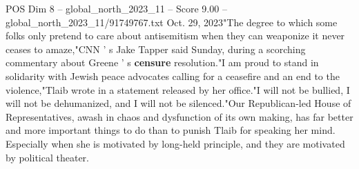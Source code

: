 \begin{textsample}{POS Dim 8 – global\_north\_2023\_11 – Score 9.00 – global\_north\_2023\_11/91749767.txt}
Oct. 29, 2023"The degree to which some folks only pretend to care about antisemitism when they can weaponize it never ceases to amaze,"CNN ' s Jake Tapper said Sunday, during a scorching commentary about Greene ' s \textbf{censure} resolution."I am proud to stand in solidarity with Jewish peace advocates calling for a ceasefire and an end to the violence,"Tlaib wrote in a statement released by her office."I will not be bullied, I will not be dehumanized, and I will not be silenced."Our Republican-led House of Representatives, awash in chaos and dysfunction of its own making, has far better and more important things to do than to punish Tlaib for speaking her mind.
Especially when she is motivated by long-held principle, and they are motivated by political theater.

\end{textsample}
